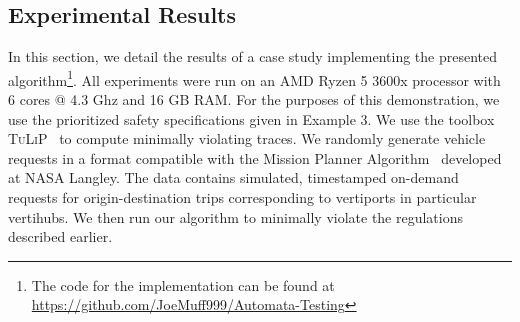 \subsection{Experimental Results}\label{sec:UAM-NFM-experiments}
In this section, we detail the results of a case study implementing the presented algorithm\footnote{The code for the implementation can be found at \url{https://github.com/JoeMuff999/Automata-Testing}}. All experiments were run on an AMD Ryzen 5 3600x processor with 6 cores @ 4.3 Ghz and 16 GB RAM. For the purposes of this demonstration, we use the prioritized safety specifications given in Example 3. We use the toolbox \textsc{TuLiP}~\cite{wongpiromsarn2011tulip} to compute minimally violating traces. 
We randomly generate vehicle requests in a format compatible with the Mission Planner Algorithm~\cite{guerreiro2019mission} developed at NASA Langley. The data contains simulated, timestamped on-demand requests for origin-destination trips corresponding to vertiports in particular vertihubs. We then run our algorithm to minimally violate the regulations described earlier.

